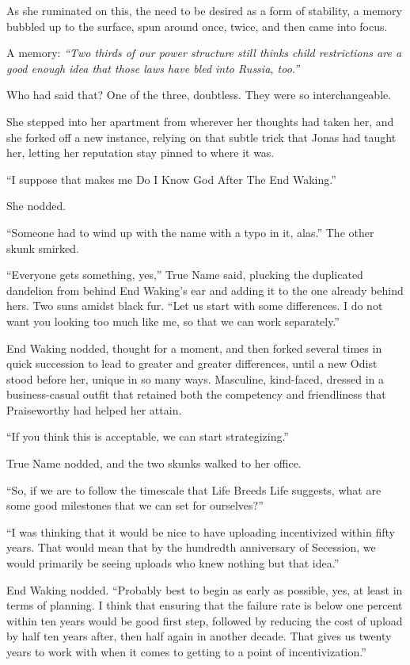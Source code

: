 As she ruminated on this, the need to be desired as a form of stability, a memory bubbled up to the surface, spun around once, twice, and then came into focus.

A memory: \emph{``Two thirds of our power structure still thinks child restrictions are a good enough idea that those laws have bled into Russia, too.''}

Who had said that? One of the three, doubtless. They were so interchangeable.

She stepped into her apartment from wherever her thoughts had taken her, and she forked off a new instance, relying on that subtle trick that Jonas had taught her, letting her reputation stay pinned to where it was.

``I suppose that makes me Do I Know God After The End Waking.''

She nodded.

``Someone had to wind up with the name with a typo in it, alas.'' The other skunk smirked.

``Everyone gets something, yes,'' True Name said, plucking the duplicated dandelion from behind End Waking's ear and adding it to the one already behind hers. Two suns amidst black fur. ``Let us start with some differences. I do not want you looking too much like me, so that we can work separately.''

End Waking nodded, thought for a moment, and then forked several times in quick succession to lead to greater and greater differences, until a new Odist stood before her, unique in so many ways. Masculine, kind-faced, dressed in a business-casual outfit that retained both the competency and friendliness that Praiseworthy had helped her attain.

``If you think this is acceptable, we can start strategizing.''

True Name nodded, and the two skunks walked to her office.

``So, if we are to follow the timescale that Life Breeds Life suggests, what are some good milestones that we can set for ourselves?''

``I was thinking that it would be nice to have uploading incentivized within fifty years. That would mean that by the hundredth anniversary of Secession, we would primarily be seeing uploads who knew nothing but that idea.''

End Waking nodded. ``Probably best to begin as early as possible, yes, at least in terms of planning. I think that ensuring that the failure rate is below one percent within ten years would be good first step, followed by reducing the cost of upload by half ten years after, then half again in another decade. That gives us twenty years to work with when it comes to getting to a point of incentivization.''

